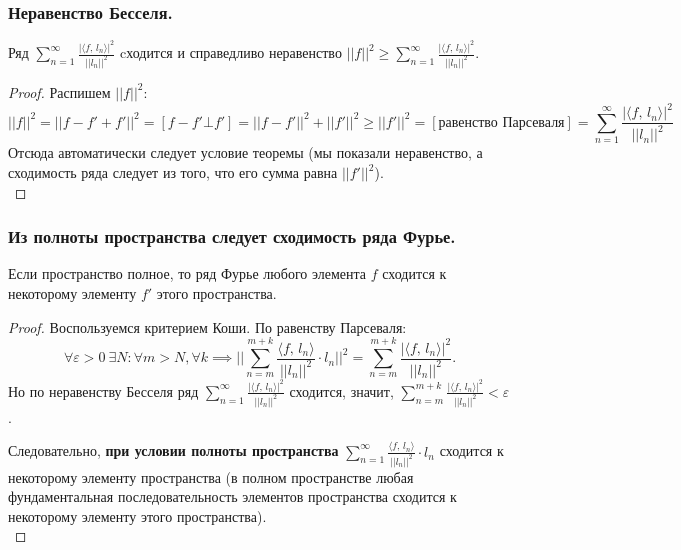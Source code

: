 \subsubsection{Неравенство Бесселя.\label{subsubsec:label2}}
\begin{theorem*}
    Ряд $\sum_{n=1}^\infty \frac{\lvert \langle f,\, l_n \rangle \rvert^2}{\lvert \lvert l_n \rvert \rvert^2}$ cходится и справедливо неравенство $\lvert \lvert f \rvert \rvert^2 \geq \sum_{n=1}^\infty \frac{\lvert \langle f,\, l_n \rangle \rvert^2}{\lvert \lvert l_n \rvert \rvert^2}$.
\end{theorem*}
\begin{proof}
    Распишем $\lvert \lvert f \rvert \rvert^2$:
    \[\lvert \lvert f \rvert \rvert^2 = \lvert \lvert f - f' + f' \rvert \rvert^2 = [f - f' \bot f'] = \lvert \lvert f - f' \rvert \rvert^2 + \lvert \lvert f' \rvert \rvert^2 \geq \lvert \lvert f' \rvert \rvert^2 = [\text{равенство Парсеваля}] = \sum_{n=1}^\infty \frac{\lvert \langle f,\, l_n \rangle \rvert^2}{\lvert \lvert l_n \rvert \rvert^2}\]
    Отсюда автоматически следует условие теоремы (мы показали неравенство, а сходимость ряда следует из того, что его сумма равна $\lvert \lvert f' \rvert \rvert^2$).\\
\end{proof}

\subsubsection{Из полноты пространства следует сходимость ряда Фурье.}
\begin{theorem*}
    Если пространство полное, то ряд Фурье любого элемента $f$ сходится к некоторому элементу $f'$ этого пространства.
\end{theorem*}
\begin{proof}
    Воспользуемся критерием Коши. По равенству Парсеваля: 
    \[\forall \varepsilon > 0\ \exists N: \forall m > N, \forall k \implies \lvert \lvert \sum_{n=m}^{m+k} \frac{\langle f,\, l_n \rangle}{\lvert \lvert l_n \rvert \rvert^2} \cdot l_n \rvert \rvert^2 = \sum_{n=m}^{m+k} \frac{\lvert \langle f,\, l_n \rangle \rvert^2}{\lvert \lvert l_n \rvert \rvert^2}.\]
    Но по неравенству Бесселя ряд $\sum_{n=1}^\infty \frac{\lvert \langle f,\, l_n \rangle \rvert^2}{\lvert \lvert l_n \rvert \rvert^2}$ сходится, значит, $\sum_{n=m}^{m+k} \frac{\lvert \langle f,\, l_n \rangle \rvert^2}{\lvert \lvert l_n \rvert \rvert^2} < \varepsilon$.

    Следовательно, \textbf{при условии полноты пространства} $\sum_{n=1}^\infty \frac{\langle f,\, l_n \rangle}{\lvert \lvert l_n \rvert \rvert^2} \cdot l_n$ сходится к некоторому элементу пространства  (в полном пространстве любая фундаментальная последовательность элементов пространства сходится к некоторому элементу этого пространства).\\  
\end{proof}

